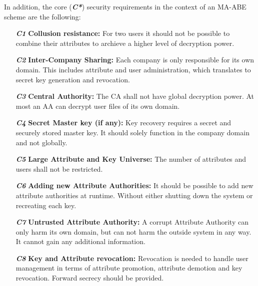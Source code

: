 In addition, the core (\textbf{\textit{C*}}) security requirements in the context of an \ac{MA-ABE} scheme are the following:
\begin{itemize}
\item[\textit{\textbf{C1}}] \textbf{Collusion resistance:} For two users it should not be possible to combine their attributes to archieve a higher level of decryption power.
\item[\textit{\textbf{C2}}] \textbf{Inter-Company Sharing:} Each company is only responsible for its own domain. This includes attribute and user administration, which translates to secret key generation and revocation. %
\item[\textit{\textbf{C3}}] \textbf{Central Authority:} The \ac{CA} shall not have global decryption power. At most an \ac{AA} can decrypt user files of its own domain.  
\item[\textit{\textbf{C4}}] \textbf{Secret Master key (if any):} Key recovery requires a secret and securely stored master key. It should solely function in the company domain and not globally. 
\item[\textit{\textbf{C5}}] \textbf{Large Attribute and Key Universe:} The number of attributes and users shall not be restricted.
\item[\textit{\textbf{C6}}] \textbf{Adding new Attribute Authorities:} It should be possible to add new attribute authorities at runtime. Without either shutting down the system or recreating each key.
\item[\textit{\textbf{C7}}] \textbf{Untrusted Attribute Authority:} A corrupt Attribute Authority can only harm its own domain, but can not harm the outside system in any way. It cannot gain any additional information.
\item[\textit{\textbf{C8}}] \textbf{Key and Attribute revocation:} Revocation is needed to handle user management in terms of attribute promotion, attribute demotion and key revocation. Forward secrecy should be provided. 
\end{itemize}

